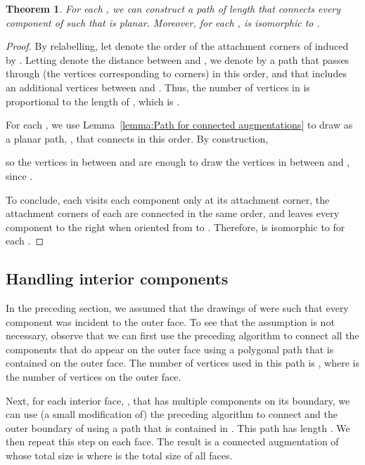 \documentclass[11pt]{patmorin}
\newtheorem{theorem}{Theorem}[section]
\begin{document}
\begin{theorem}\label{theorem:main}
For each , we can construct a path  of length  that connects every component of  such that  is planar. Moreover, for each ,  is isomorphic to .
\end{theorem}
\begin{proof}
By relabelling, let  denote the order of the attachment corners of  induced by .  Letting  denote the  distance between  and , we denote by  a path that passes through (the vertices corresponding to corners)  in this order, and that includes an additional  vertices between  and .  Thus, the number of vertices in  is proportional to the length of , which is .

For each , we use Lemma~\ref{lemma:Path for connected augmentations}
to draw  as a planar path, , that connects  in this order. By construction, 

so the  vertices in 
between  and  are enough to draw the 
 vertices in  between  and
, since .






To conclude, each  visits each component only at its attachment corner, the attachment corners of each  are connected in the same order, and  leaves every component to the right when oriented from  to . Therefore,  is isomorphic to  for each .
\end{proof}

\subsection{Handling interior components}

In the preceding section, we assumed that the drawings  of  were such that every component was incident to the outer face.
To see that the assumption is not necessary, observe that we can first use the preceding algorithm to connect all the components that do appear on the outer face using a polygonal path that is contained on the outer face.  The number of vertices used in this path is , where  is the number of vertices on the outer face.

Next, for each interior face, , that has multiple components
 on its boundary, we can use (a small modification of)
the preceding algorithm to connect  and the outer
boundary of  using a path that is contained in .  This path
has length .  We then repeat this step on each face.
The result is a connected augmentation of  whose total size
is  where  is the total size of all faces.
\end{document}
